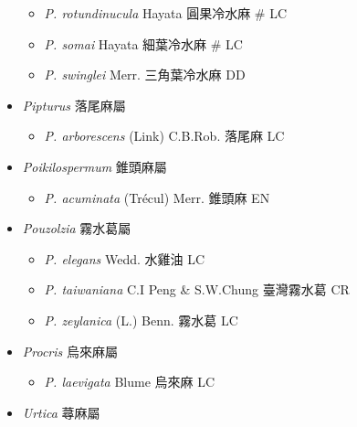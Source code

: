 \begin{itemize}
\begin{itemize}
        \item[] \textit{P. rotundinucula} Hayata  圓果冷水麻  \# LC
        \item[] \textit{P. somai} Hayata  細葉冷水麻  \# LC
        \item[] \textit{P. swinglei} Merr.  三角葉冷水麻   DD
  \end{itemize}
 \item[] \textit{Pipturus} 落尾麻屬
                                
  \begin{itemize}
        \item[] \textit{P. arborescens} (Link) C.B.Rob.  落尾麻   LC
  \end{itemize}
 \item[] \textit{Poikilospermum} 錐頭麻屬
                                
  \begin{itemize}
        \item[] \textit{P. acuminata} (Trécul) Merr.  錐頭麻   EN
  \end{itemize}
 \item[] \textit{Pouzolzia} 霧水葛屬
                                
  \begin{itemize}
        \item[] \textit{P. elegans} Wedd.  水雞油   LC
        \item[] \textit{P. taiwaniana} C.I Peng \& S.W.Chung  臺灣霧水葛   CR
        \item[] \textit{P. zeylanica} (L.) Benn.  霧水葛   LC
  \end{itemize}
 \item[] \textit{Procris} 烏來麻屬
                                
  \begin{itemize}
        \item[] \textit{P. laevigata} Blume  烏來麻   LC
  \end{itemize}
 \item[] \textit{Urtica} 蕁麻屬
                                

\end{itemize}
